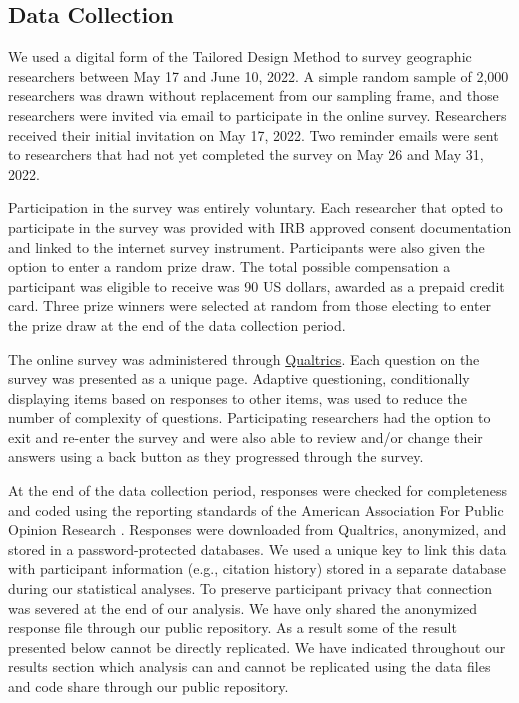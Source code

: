 \documentclass[]{interact}
\theoremstyle{plain}%
\theoremstyle{definition}
\theoremstyle{remark}
\begin{document}
\subsection*{Data Collection}
We used a digital form of the Tailored Design Method \citep{dillman2014internet} to survey geographic researchers between May 17 and June 10, 2022.
A simple random sample of 2,000 researchers was drawn without replacement from our sampling frame, and those researchers were invited via email to participate in the online survey. 
Researchers received their initial invitation on May 17, 2022. 
Two reminder emails were sent to researchers that had not yet completed the survey on May 26 and May 31, 2022.

Participation in the survey was entirely voluntary. 
Each researcher that opted to participate in the survey was provided with IRB approved consent documentation and linked to the internet survey instrument. 
Participants were also given the option to enter a random prize draw. 
The total possible compensation a participant was eligible to receive was 90 US dollars, awarded as a prepaid credit card.
Three prize winners were selected at random from those electing to enter the prize draw at the end of the data collection period.

The online survey was administered through \href{https://www.qualtrics.com/}{Qualtrics}. 
Each question on the survey was presented as a unique page. 
Adaptive questioning, conditionally displaying items based on responses to other items, was used to reduce the number of complexity of questions.
Participating researchers had the option to exit and re-enter the survey and were also able to review and/or change their answers using a back button as they progressed through the survey.

At the end of the data collection period, responses were checked for completeness and coded using the reporting standards of the American Association For Public Opinion Research \citep{aaporstandards}.
Responses were downloaded from Qualtrics, anonymized, and stored in a password-protected databases.
We used a unique key to link this data with participant information (e.g., citation history) stored in a separate database during our statistical analyses. 
To preserve participant privacy that connection was severed at the end of our analysis.
We have only shared the anonymized response file through our public repository. 
As a result some of the result presented below cannot be directly replicated. 
We have indicated throughout our results section which analysis can and cannot be replicated using the data files and code share through our public repository. 
\end{document}
